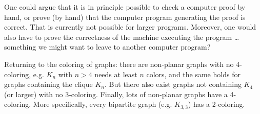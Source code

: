 One could argue that it is in principle possible to check a computer
proof by hand, or prove (by hand) that the computer program generating
the proof is correct. That is currently not possible for larger
programs. Moreover, one would also have to prove the correctness of
the machine executing the program \ldots something we might want to
leave to another computer program?

Returning to the coloring of graphs: there are non-planar graphs with
no 4-coloring, e.g. $K_{n}$ with $n > 4$ needs at least $n$ colors,
and the same holds for graphs containing the clique $K_n$. But there also
exist graphs not containing $K_4$ (or larger) with no
3-coloring. Finally, lots of non-planar graphs have a 4-coloring. More
specifically, every bipartite graph (e.g. $K_{3,3}$) has a 2-coloring.


